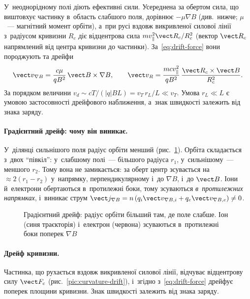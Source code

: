 У~неоднорідному полі діють ефективні сили. Усереднена за обертом сила, що виштовхує
частинку в~область слабшого поля, дорівнює $-\mu\nabla B$ (див.~нижче; $\mu$~--- магнітний
момент орбіти), а~при русі вздовж викривленої силової лінії з~радіусом кривизни $R_c$ діє
відцентрова сила $mv_\parallel^2\vect R_c/R_c^2$ (вектор $\vect R_c$ напрямлений від
центра кривизни до частинки). За~\eqref{eq:drift-force} вони породжують
 та  дрейфи
\begin{equation}\label{eq:gradB-drift}
	\vect v_{\nabla B}=\frac{c\mu}{qB^2}\,\vect B\times\nabla B,\qquad
	\vect v_{R}=\frac{mcv_\parallel^2}{qB^2}\,\frac{\vect R_c\times\vect B}{R_c^2}.
\end{equation}
За порядком величини $v_d\sim cT/(|q|BL)=v_T\,r_L/L\ll v_T$. Умова $r_L\ll L$
є умовою застосовності дрейфового наближення, а~знак швидкості залежить від знака заряду.

\paragraph{Градієнтний дрейф: чому він виникає.}
У~ділянці сильнішого поля радіус орбіти менший (рис.~\ref{pic:grad-drift}). Орбіта складається
з~двох \enquote{півкіл}: у~слабшому полі~--- більшого радіуса $r_1$, у~сильнішому~--- меншого $r_2$.
Тому вона не замикається: за оберт центр зсувається на $\approx2(r_1-r_2)$ у~напрямку,
перпендикулярному і~до $\nabla B$, і~до $\vect B$. Іони й~електрони обертаються в~протилежні боки, тому
зсуваються \emph{в~протилежних напрямках}, і~виникає струм
$\vect j_{\nabla B}=n\,(q_i\vect v_{\nabla B,i}+q_e\vect v_{\nabla B,e})\ne0$.

\begin{figure}[h!]\centering
	\caption{Градієнтний дрейф: радіус орбіти більший там, де поле слабше. Іон (синя
	траєкторія) і~електрон (червона) зсуваються в~протилежні боки поперек $\nabla B$}
	\label{pic:grad-drift}
\end{figure}

\paragraph{Дрейф кривизни.}
Частинка, що рухається вздовж викривленої силової лінії, відчуває відцентрову силу
$\vect F_c$ (рис.~\ref{pic:curvature-drift}), і~згідно з~\eqref{eq:drift-force} дрейфує
поперек площини кривизни. Знак швидкості залежить від знака заряду.

